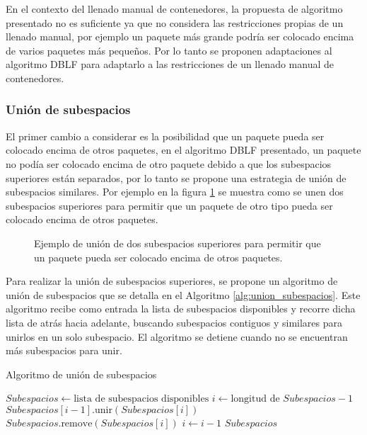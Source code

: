 En el contexto del llenado manual de contenedores, la propuesta de algoritmo presentado no es suficiente ya que no considera las restricciones propias de un llenado manual, por ejemplo un paquete más grande podría ser colocado encima de varios paquetes más pequeños. Por lo tanto se proponen adaptaciones al algoritmo DBLF para adaptarlo a las restricciones de un llenado manual de contenedores.

\subsubsection{Unión de subespacios}

El primer cambio a considerar es la posibilidad que un paquete pueda ser colocado encima de otros paquetes, en el algoritmo DBLF presentado, un paquete no podía ser colocado encima de otro paquete debido a que los subespacios superiores están separados, por lo tanto se propone una estrategia de unión de subespacios similares. Por ejemplo en la figura \ref{fig:union_subespacios} se muestra como se unen dos subespacios superiores para permitir que un paquete de otro tipo pueda ser colocado encima de otros paquetes.

\begin{figure}[H]
    \centering
    
    \caption{Ejemplo de unión de dos subespacios superiores para permitir que un paquete pueda ser colocado encima de otros paquetes.}
    \label{fig:union_subespacios}
\end{figure}

Para realizar la unión de subespacios superiores, se propone un algoritmo de unión de subespacios que se detalla en el Algoritmo \ref{alg:union_subespacios}. Este algoritmo recibe como entrada la lista de subespacios disponibles y recorre dicha lista de atrás hacia adelante, buscando subespacios contiguos y similares para unirlos en un solo subespacio. El algoritmo se detiene cuando no se encuentran más subespacios para unir.

\begin{algorithm}[H]
    \caption{Algoritmo de unión de subespacios}
    \label{alg:union_subespacios}
    \begin{algorithmic}[1]
        \State $Subespacios \gets \text{lista de subespacios disponibles}$
        \State $i \gets \text{longitud de } Subespacios - 1$
        \State $Subespacios[i-1].\text{unir}(Subespacios[i])$
        \State $Subespacios.\text{remove}(Subespacios[i])$
        \EndIf
        \State $i \gets i - 1$
        \EndWhile
        \State \Return $Subespacios$
    \end{algorithmic}
\end{algorithm}

